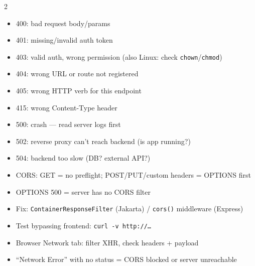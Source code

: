 \documentclass[11pt, letterpaper]{article}
\begin{document}
\begin{tcolorbox}[colback=part6bg, colframe=sectionred,
  title={\bfseries HTTP Codes \& API Debugging}, arc=3pt, boxrule=1pt]
\footnotesize
\begin{multicols}{2}
\begin{itemize}[noitemsep, leftmargin=*]
  \item 400: bad request body/params
  \item 401: missing/invalid auth token
  \item 403: valid auth, wrong permission (also Linux: check \texttt{chown}/\texttt{chmod})
  \item 404: wrong URL or route not registered
  \item 405: wrong HTTP verb for this endpoint
  \item 415: wrong Content-Type header
  \item 500: crash --- read server logs first
  \item 502: reverse proxy can't reach backend (is app running?)
  \item 504: backend too slow (DB? external API?)
\end{itemize}
\columnbreak
\begin{itemize}[noitemsep, leftmargin=*]
  \item CORS: GET = no preflight; POST/PUT/custom headers = OPTIONS first
  \item OPTIONS 500 = server has no CORS filter
  \item Fix: \texttt{ContainerResponseFilter} (Jakarta) / \texttt{cors()} middleware (Express)
  \item Test bypassing frontend: \texttt{curl -v http://\ldots}
  \item Browser Network tab: filter XHR, check headers + payload
  \item ``Network Error'' with no status = CORS blocked or server unreachable
\end{itemize}
\end{multicols}
\end{tcolorbox}

\vspace{4pt}
\end{document}

